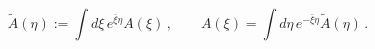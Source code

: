 \begin{equation}
\tilde{A}(\eta ):=\int d\xi \,e^{\bar{\xi}\eta }A(\xi )\,,\qquad A(\xi
)=\int d\eta \,e^{-\bar{\xi}\eta }\tilde{A}(\eta )\,.
\end{equation}

